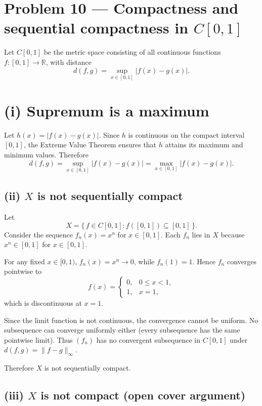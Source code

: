 \documentclass[12pt,a4paper]{article}
\theoremstyle{plain}
\theoremstyle{definition}
\theoremstyle{remark}
\theoremstyle{remark}
\begin{document}
\section*{Problem 10 — Compactness and sequential compactness in $C[0,1]$}

Let $C[0,1]$ be the metric space consisting of all continuous functions $f:[0,1]\to\mathbb{R}$,
with distance
\[
d(f,g)=\sup_{x\in[0,1]}|f(x)-g(x)|.
\]

\bigskip

\section*{(i) Supremum is a maximum}

Let $h(x)=|f(x)-g(x)|$. Since $h$ is continuous on the compact interval $[0,1]$,
the Extreme Value Theorem ensures that $h$ attains its maximum and minimum values.
Therefore
\[
d(f,g)=\sup_{x\in[0,1]}|f(x)-g(x)|=\max_{x\in[0,1]}|f(x)-g(x)|.
\]

\bigskip

\subsection*{(ii) $X$ is not sequentially compact}

Let
\[
X=\{\, f\in C[0,1] : f([0,1])\subseteq[0,1]\,\}.
\]
Consider the sequence $f_n(x)=x^n$ for $x\in[0,1]$.
Each $f_n$ lies in $X$ because $x^n\in[0,1]$ for $x\in[0,1]$.

For any fixed $x\in[0,1)$, $f_n(x)=x^n\to 0$, while $f_n(1)=1$.
Hence $f_n$ converges pointwise to
\[
f(x)=
\begin{cases}
	0, & 0\le x<1,\\[3pt]
	1, & x=1,
\end{cases}
\]
which is discontinuous at $x=1$.

Since the limit function is not continuous, the convergence cannot be uniform.
No subsequence can converge uniformly either (every subsequence has the same pointwise limit).
Thus $(f_n)$ has no convergent subsequence in $C[0,1]$ under $d(f,g)=\|f-g\|_\infty$.

Therefore $X$ is not sequentially compact.

\bigskip

\subsection*{(iii) $X$ is not compact (open cover argument)}
\end{document}
